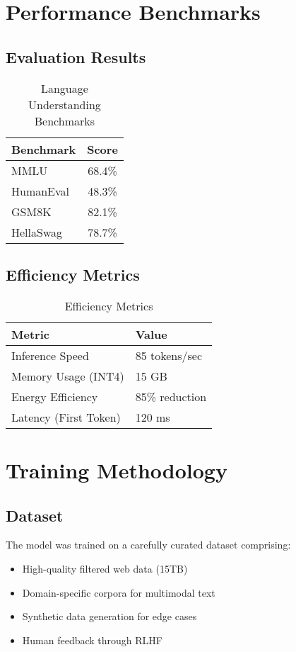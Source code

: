 \documentclass[11pt,a4paper]{article}
\begin{document}
\section{Performance Benchmarks}

\subsection{Evaluation Results}


\begin{table}[H]
\centering
\begin{tabular}{lc}
\toprule
\textbf{Benchmark} & \textbf{Score} \\
\midrule
MMLU & 68.4\% \\
HumanEval & 48.3\% \\
GSM8K & 82.1\% \\
HellaSwag & 78.7\% \\
\bottomrule
\end{tabular}
\caption{Language Understanding Benchmarks}
\end{table}

\subsection{Efficiency Metrics}

\begin{table}[H]
\centering
\begin{tabular}{ll}
\toprule
\textbf{Metric} & \textbf{Value} \\
\midrule
Inference Speed & 85 tokens/sec \\
Memory Usage (INT4) & 15 GB \\
Energy Efficiency & 85\% reduction \\
Latency (First Token) & 120 ms \\
\bottomrule
\end{tabular}
\caption{Efficiency Metrics}
\end{table}

\section{Training Methodology}

\subsection{Dataset}
The model was trained on a carefully curated dataset comprising:
\begin{itemize}
    \item High-quality filtered web data (15TB)
    \item Domain-specific corpora for multimodal text
    \item Synthetic data generation for edge cases
    \item Human feedback through RLHF
\end{itemize}
\end{document}
